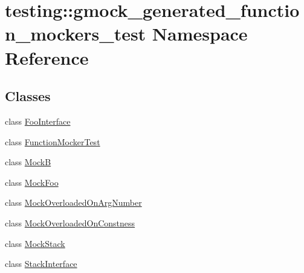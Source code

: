 \hypertarget{namespacetesting_1_1gmock__generated__function__mockers__test}{}\section{testing\+:\+:gmock\+\_\+generated\+\_\+function\+\_\+mockers\+\_\+test Namespace Reference}
\label{namespacetesting_1_1gmock__generated__function__mockers__test}
\subsection*{Classes}
\begin{DoxyCompactItemize}
\item 
class \hyperlink{classtesting_1_1gmock__generated__function__mockers__test_1_1FooInterface}{Foo\+Interface}
\item 
class \hyperlink{classtesting_1_1gmock__generated__function__mockers__test_1_1FunctionMockerTest}{Function\+Mocker\+Test}
\item 
class \hyperlink{classtesting_1_1gmock__generated__function__mockers__test_1_1MockB}{MockB}
\item 
class \hyperlink{classtesting_1_1gmock__generated__function__mockers__test_1_1MockFoo}{Mock\+Foo}
\item 
class \hyperlink{classtesting_1_1gmock__generated__function__mockers__test_1_1MockOverloadedOnArgNumber}{Mock\+Overloaded\+On\+Arg\+Number}
\item 
class \hyperlink{classtesting_1_1gmock__generated__function__mockers__test_1_1MockOverloadedOnConstness}{Mock\+Overloaded\+On\+Constness}
\item 
class \hyperlink{classtesting_1_1gmock__generated__function__mockers__test_1_1MockStack}{Mock\+Stack}
\item 
class \hyperlink{classtesting_1_1gmock__generated__function__mockers__test_1_1StackInterface}{Stack\+Interface}
\end{DoxyCompactItemize}
